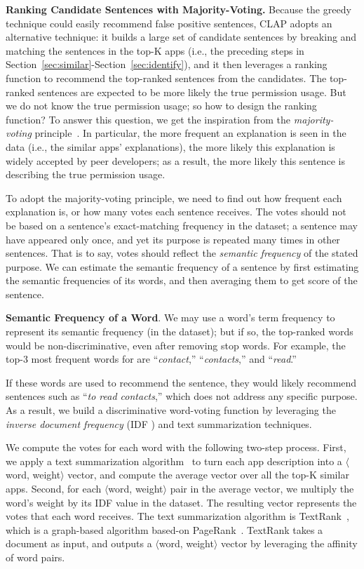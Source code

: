 \textbf{Ranking Candidate Sentences with Majority-Voting. } Because the greedy technique could easily recommend false positive sentences, CLAP adopts an alternative technique: 
it builds a large set of candidate sentences by breaking and matching the sentences in the top-K apps (i.e., the preceding steps in Section~\ref{sec:similar}-Section~\ref{sec:identify}), and it then leverages a ranking function to recommend the top-ranked sentences from the candidates. 
The top-ranked sentences are expected to be more likely the true permission usage. 
But we do not know the true permission usage; so how to design the ranking function? 
To answer this question, we get the inspiration from the \emph{majority-voting} principle~\cite{Dawid:Skene:79}. 
In particular, the more frequent an explanation is seen in the data (i.e., the similar apps' explanations), the more likely this explanation is widely accepted by peer developers; 
as a result, the more likely this sentence is describing the true permission usage. 

To adopt the majority-voting principle, we need to find out how frequent each explanation is, or how many votes each sentence receives. 
The votes should not be based on a sentence's exact-matching frequency in the dataset; 
a sentence may have appeared only once, and yet its purpose is repeated many times in other sentences. 
That is to say, votes should reflect the \emph{semantic frequency} of the stated purpose. 
We can estimate the semantic frequency of a sentence by first estimating the semantic frequencies of its words, and then averaging them to get score of the sentence. 

\textbf{Semantic Frequency of a Word}. We may use a word's term frequency to represent its semantic frequency (in the dataset); 
but if so, the top-ranked words would be non-discriminative, even after removing stop words. 
For example, the top-3 most frequent words for  are ``\emph{contact},'' ``\emph{contacts},'' and ``\emph{read}.''

If these words are used to recommend the sentence, they would likely recommend sentences such as ``\emph{to read contacts},'' which does not address any specific purpose. 
As a result, we build a discriminative word-voting function by leveraging the \emph{inverse document frequency} (IDF \cite{idf}) and text summarization techniques. 

We compute the votes for each word with the following two-step process. 
First, we apply a text summarization algorithm~\cite{Mihalcea04TextRank} to turn each app description into a $\langle$word, weight$\rangle$ vector, and compute the average vector over all the top-K similar apps. 
Second, for each $\langle$word, weight$\rangle$ pair in the average vector, we multiply the word's weight by its IDF value in the dataset. 
The resulting vector represents the votes that each word receives. 
The text summarization algorithm is TextRank~\cite{Mihalcea04TextRank}, which is a graph-based algorithm based-on PageRank~\cite{page1999}. 
TextRank takes a document as input, and outputs a $\langle$word, weight$\rangle$ vector by leveraging the affinity of word pairs.

